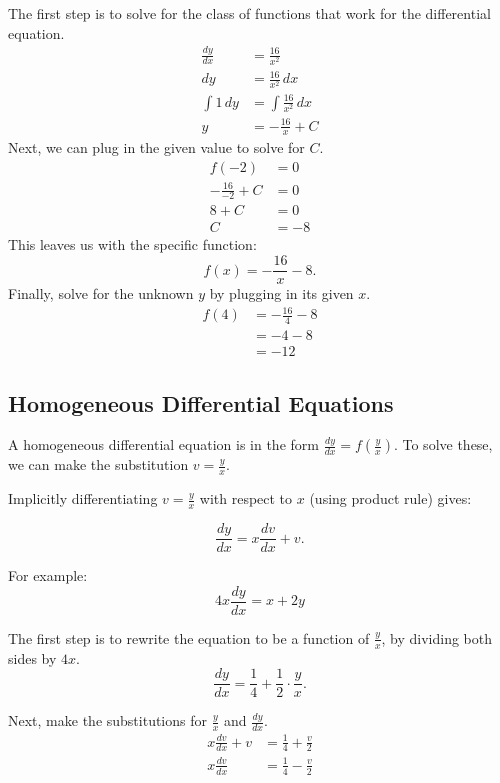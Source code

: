 \documentclass[12pt]{article}
\begin{document}
The first step is to solve for the class of functions that work for the differential equation.
\begin{align*}
	\frac{dy}{dx} & = \frac{16}{x^2}            \\[6pt]
	dy            & = \frac{16}{x^2} \, dx      \\[6pt]
	\int 1 \, dy  & = \int \frac{16}{x^2} \, dx \\[6pt]
	y             & = -\frac{16}{x} + C
\end{align*}
Next, we can plug in the given value to solve for $C$.
\begin{align*}
	f(-2)              & = 0  \\
	-\frac{16}{-2} + C & = 0  \\[6pt]
	8 + C              & = 0  \\
	C                  & = -8
\end{align*}
This leaves us with the specific function:
\[ f(x) = -\frac{16}{x} - 8. \]
Finally, solve for the unknown $y$ by plugging in its given $x$.
\begin{align*}
	f(4) & = -\frac{16}{4} - 8 \\[6pt]
	& = -4 - 8            \\
	& = -12
\end{align*}

\subsection{Homogeneous Differential Equations}
A homogeneous differential equation is in the form $\frac{dy}{dx} = f \left( \frac{y}{x} \right)$. To solve these, we can make the substitution $v = \frac{y}{x}$.

Implicitly differentiating $v = \frac{y}{x}$ with respect to $x$ (using product rule) gives:

\[ \frac{dy}{dx} = x \frac{dv}{dx} + v .\]

For example:
\[ 4x \frac{dy}{dx} = x + 2y \]

The first step is to rewrite the equation to be a function of $\frac{y}{x}$, by dividing both sides by $4x$.
\[ \frac{dy}{dx} = \frac{1}{4} + \frac{1}{2} \cdot \frac{y}{x}. \]

Next, make the substitutions for $\frac{y}{x}$ and $\frac{dy}{dx}$.
\begin{align*}
	x \frac{dv}{dx} + v & = \frac{1}{4} + \frac{v}{2} \\[6pt]
	x \frac{dv}{dx}     & = \frac{1}{4} - \frac{v}{2}
\end{align*}
\end{document}
